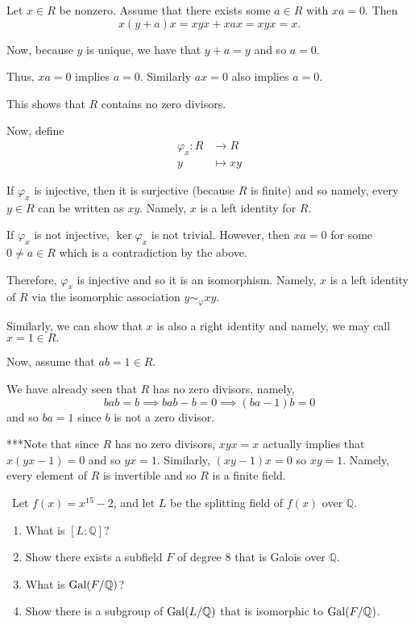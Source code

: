 \documentclass[12pt]{AlgebraQual}
\begin{document}
\begin{solution}
Let $x\in R$ be nonzero. Assume that there exists some $a\in R$ with $xa=0.$ Then $$x(y+a)x=xyx+xax=xyx=x.$$

Now, because $y$ is unique, we have that $y+a=y$ and so $a=0$.

Thus, $xa=0$ implies $a=0.$ Similarly $ax=0$ also implies $a=0$.

This shows that $R$ contains no zero divisors.

Now, define \begin{align*}
        \varphi_x: R&\to R\\
        y&\mapsto xy
    \end{align*}

If $\varphi_x$ is injective, then it is surjective (because $R$ is finite) and so namely, every $y\in R$ can be written as $xy$. Namely, $x$ is a left identity for $R.$

If $\varphi_x$ is not injective, $\ker\varphi_x$ is not trivial. However, then $xa=0$ for some $0\not=a\in R$ which is a contradiction by the above.

Therefore, $\varphi_x$ is injective and so it is an isomorphism. Namely, $x$ is a left identity of $R$ via the isomorphic association $y\sim_\varphi xy$.

Similarly, we can show that $x$ is also a right identity and namely, we may call $x=1\in R.$

Now, assume that $ab=1\in R.$

We have already seen that $R$ has no zero divisors, namely, $$bab=b\implies bab-b=0\implies (ba-1)b=0$$ and so $ba=1$ since $b$ is not a zero divisor.

\begin{mybox}
***Note that since $R$ has no zero divisors, $xyx=x$ actually implies that $x(yx-1)=0$ and so $yx=1$. Similarly, $(xy-1)x=0$ so $xy=1$. Namely, every element of $R$ is invertible and so $R$ is a finite field.
\end{mybox}

\end{solution}
\newpage



\begin{problem} $\,$
Let $f(x)=x^{15}-2$, and let $L$ be the splitting field of $f(x)$ over $\mathbb{Q}$.
\begin{enumerate}[label=(\alph*)]
    \item What is $[L:\mathbb{Q}]$?
    \item Show there exists a subfield $F$ of degree $8$ that is Galois over $\mathbb{Q}$.
    \item What is $\text{Gal}(F/\mathbb{Q})$?
    \item Show there is a subgroup of $\text{Gal}(L/\mathbb{Q})$ that is isomorphic to $\text{Gal}(F/\mathbb{Q})$.
\end{enumerate}
\end{problem}
\end{document}
